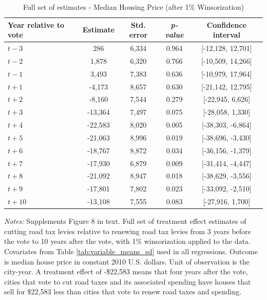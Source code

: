 \begin{table}[htbp]
    \centering
    \caption{Full set of estimates - Median Housing Price (after 1\% Winsorization)}
    \label{tab:median_sale_amount_winsorized}
    \begin{tabular}{p{3cm}cccc}
        \hline
        \textbf{Year relative to vote} & \textbf{Estimate} & \textbf{Std. error} & \textbf{\textit{p-value}} & \textbf{Confidence interval} \\
        \hline
        $t - 3$  & 286     & 6,334  & 0.964  & [-12,128, 12,701] \\
        $t - 2$  & 1,878   & 6,320  & 0.766  & [-10,509, 14,266] \\
        $t - 1$  & 3,493   & 7,383  & 0.636  & [-10,979, 17,964] \\
        $t + 1$  & -4,173  & 8,657  & 0.630  & [-21,142, 12,795] \\
        $t + 2$  & -8,160  & 7,544  & 0.279  & [-22,945, 6,626] \\
        $t + 3$  & -13,364 & 7,497  & 0.075  & [-28,058, 1,330] \\
        $t + 4$  & -22,583 & 8,020  & 0.005  & [-38,303, -6,864] \\
        $t + 5$  & -21,063 & 8,996  & 0.019  & [-38,696, -3,430] \\
        $t + 6$  & -18,767 & 8,872  & 0.034  & [-36,156, -1,379] \\
        $t + 7$  & -17,930 & 6,879  & 0.009  & [-31,414, -4,447] \\
        $t + 8$  & -21,092 & 8,947  & 0.018  & [-38,629, -3,556] \\
        $t + 9$  & -17,801 & 7,802  & 0.023  & [-33,092, -2,510] \\
        $t + 10$ & -13,108 & 7,555  & 0.083  & [-27,916, 1,700] \\
        \hline
    \end{tabular}
    \begin{tablenotes}
        \small
        \item \textit{Notes:} Supplements Figure 8 in text. Full set of treatment effect estimates of cutting road tax levies relative to renewing road tax levies from 3 years before the vote to 10 years after the vote, with 1\% winsorization applied to the data. Covariates from Table \ref{tab:variable_means_sd} used in all regressions. Outcome is median house price in constant 2010 U.S. dollars. Unit of observation is the city-year. A treatment effect of -\$22,583 means that four years after the vote, cities that vote to cut road taxes and its associated spending have houses that sell for \$22,583 less than cities that vote to renew road taxes and spending.
    \end{tablenotes}
\end{table}



